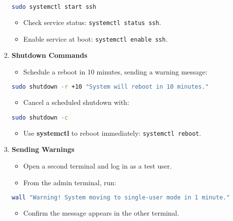 \documentclass[12pt,a4paper]{report}
\begin{document}
\begin{enumerate}
\begin{lstlisting}[language=bash]
sudo systemctl start ssh
\end{lstlisting}

\begin{itemize}
        \item Check service status: \texttt{systemctl status ssh}.
        \item Enable service at boot: \texttt{systemctl enable ssh}.
    \end{itemize}
    \item \textbf{Shutdown Commands}
    \begin{itemize}
        \item Schedule a reboot in 10 minutes, sending a warning message:
\end{itemize}

\begin{lstlisting}[language=bash]
sudo shutdown -r +10 "System will reboot in 10 minutes."
\end{lstlisting}

\begin{itemize}
        \item Cancel a scheduled shutdown with:
\end{itemize}

\begin{lstlisting}[language=bash]
sudo shutdown -c
\end{lstlisting}

\begin{itemize}
        \item Use \textbf{systemctl} to reboot immediately: \texttt{systemctl reboot}.
    \end{itemize}
    \item \textbf{Sending Warnings}
    \begin{itemize}
        \item Open a second terminal and log in as a test user.
        \item From the admin terminal, run:
\end{itemize}

\begin{lstlisting}[language=bash]
wall "Warning! System moving to single-user mode in 1 minute."
\end{lstlisting}

\begin{itemize}
        \item Confirm the message appears in the other terminal.
    \end{itemize}
\end{enumerate}
\end{document}
